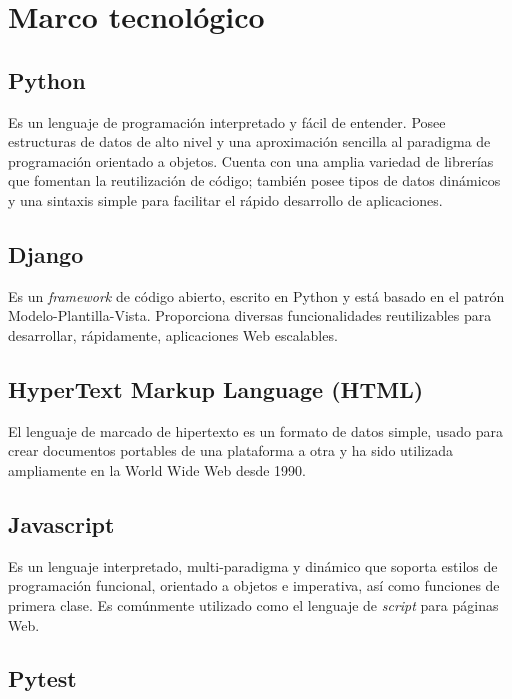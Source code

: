 \chapter{\textbf{Marco tecnológico}}
\thispagestyle{empty}

\section{Python}

Es un lenguaje de programación interpretado y fácil de entender. Posee estructuras de datos de alto nivel y una aproximación sencilla al paradigma de programación orientado a objetos. Cuenta con una amplia variedad de librerías que fomentan la reutilización de código; también posee tipos de datos dinámicos y una sintaxis simple para facilitar el rápido desarrollo de aplicaciones.
 \citep{Python_tutorial}

\section{Django}

Es un \textit{framework} de código abierto, escrito en Python y está basado en el patrón Modelo-Plantilla-Vista. Proporciona diversas funcionalidades reutilizables para desarrollar, rápidamente, aplicaciones Web escalables. 

\section{HyperText Markup Language (HTML)}

El lenguaje de marcado de hipertexto es un formato de datos simple, usado para crear documentos portables de una plataforma a otra y ha sido utilizada ampliamente en la World Wide Web desde 1990. \citep{RFC1866}

\section{Javascript}

Es un lenguaje interpretado, multi-paradigma y dinámico que soporta estilos de programación funcional,  orientado a objetos e imperativa, así como funciones de primera clase. Es comúnmente utilizado como el lenguaje de \textit{script} para páginas Web. \citep{javascript}

\section{Pytest}

